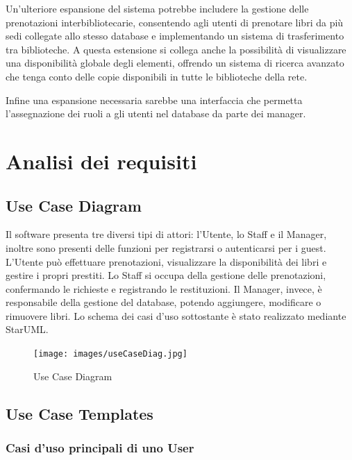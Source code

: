 \documentclass[twoside,openright,titlepage,fleqn,headinclude,12pt,a4paper,BCOR=5mm,footinclude]{scrbook}
\begin{document}
Un’ulteriore espansione del sistema potrebbe includere la gestione delle prenotazioni interbibliotecarie, consentendo agli utenti di prenotare libri da più sedi collegate allo stesso database e implementando un sistema di trasferimento tra biblioteche. A questa estensione si collega anche la possibilità di visualizzare una disponibilità globale degli elementi, offrendo un sistema di ricerca avanzato che tenga conto delle copie disponibili in tutte le biblioteche della rete.

Infine una espansione necessaria sarebbe una interfaccia che permetta l'assegnazione dei ruoli a gli utenti nel database da parte dei manager.


\chapter{Analisi dei requisiti}
\section{Use Case Diagram}
Il software presenta tre diversi tipi di attori: l'Utente, lo Staff e il Manager, inoltre sono presenti delle funzioni per registrarsi o autenticarsi per i guest. L'Utente può effettuare prenotazioni, visualizzare la disponibilità dei libri e gestire i propri prestiti. Lo Staff si occupa della gestione delle prenotazioni,  confermando le richieste e registrando le restituzioni. Il Manager, invece, è responsabile della gestione del database, potendo aggiungere, modificare o rimuovere libri. Lo schema dei casi d’uso sottostante è stato realizzato mediante StarUML.

\begin{figure}[H]
  \centering
  \texttt{[image: images/useCaseDiag.jpg]}
  \caption{Use Case Diagram}
  \label{fig:Use Case Diagram}
\end{figure}

\section{Use Case Templates}


\subsection{Casi d’uso principali di uno User}
\end{document}
